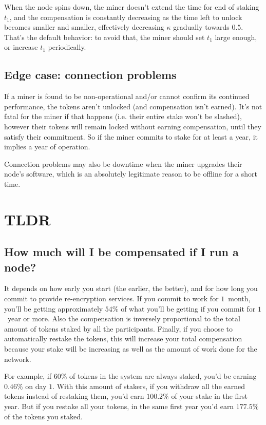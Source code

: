 \documentclass[longbibliography,nofootinbib,twocolumn]{revtex4-1}
\begin{document}
When the node spins down, the miner doesn't extend the time for end of staking $t_1$,
and the compensation is constantly decreasing as the time left to unlock becomes smaller and smaller,
effectively decreasing $\kappa$ gradually towards $0.5$.
That's the default behavior: to avoid that, the miner should set $t_1$ large enough, or increase $t_1$ periodically.

\subsection{Edge case: connection problems}

If a miner is found to be non-operational and/or cannot confirm its continued performance, the tokens aren't unlocked (and compensation isn't earned).
It's not fatal for the miner if that happens (i.e. their entire stake won't be slashed), however their tokens will remain locked without earning compensation,
until they satisfy their commitment.
So if the miner commits to stake for at least a year, it implies a year of operation.

Connection problems may also be downtime when the miner upgrades their node's software, which is an absolutely legitimate reason to be offline for a short time.

\section{TLDR}

\subsection{How much will I be compensated if I run a node?}
It depends on how early you start (the earlier, the better), and for how long you commit to provide re-encryption services.
If you commit to work for $1$~month, you'll be getting approximately $54\%$ of what you'll be getting if you commit for $1$~year or more.
Also the compensation is inversely proportional to the total amount of tokens staked by all the participants.
Finally, if you choose to automatically restake the tokens, this will increase your total compensation because your stake will be increasing as
well as the amount of work done for the network.

For example, if $60\%$ of tokens in the system are always staked, you'd be earning $0.46\%$ on day $1$.
With this amount of stakers, if you withdraw all the earned tokens instead of restaking them, you'd earn $100.2\%$ of your stake in the first year.
But if you restake all your tokens, in the same first year you'd earn $177.5\%$ of the tokens you staked.
\end{document}
